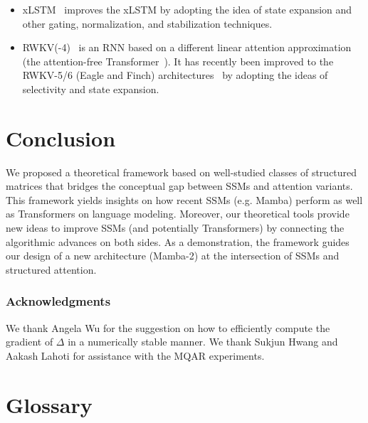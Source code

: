 \documentclass{article}
\newcommand{\citep}{\parencite}
\begin{document}
\begin{itemize}[leftmargin=*,itemsep=0pt,topsep=0pt]
  \item xLSTM~\citep{beck2024xlstm} improves the xLSTM by adopting the idea of state expansion and other gating, normalization, and stabilization techniques.

  \item RWKV(-4)~\citep{peng2023rwkv} is an RNN based on a different linear attention approximation (the attention-free Transformer~\citep{zhai2021attention}).
    It has recently been improved to the RWKV-5/6 (Eagle and Finch) architectures~\citep{peng2024eagle} by adopting the ideas of selectivity and state expansion.
\end{itemize}

\section{Conclusion}
\label{sec:conclusion}

We proposed a theoretical framework based on well-studied classes of structured
matrices that bridges the conceptual gap between SSMs and attention variants.
This framework yields insights on how recent SSMs (e.g. Mamba) perform as well
as Transformers on language modeling.
Moreover, our theoretical tools provide new ideas to improve SSMs (and
potentially Transformers) by connecting the algorithmic\iftoggle{arxiv}{ and systems}{} advances on
both sides.
As a demonstration, the framework guides our design of a new architecture
(Mamba-2) at the intersection of SSMs and structured attention.

\subsubsection*{Acknowledgments}
We thank Angela Wu for the suggestion on how to efficiently compute
the gradient of $\Delta$ in a numerically stable manner.
We thank Sukjun Hwang and Aakash Lahoti for assistance with the MQAR experiments.

\printbibliography

\newpage

\appendix

\onecolumn

\section{Glossary}
\label{sec:glossary}
\end{document}
